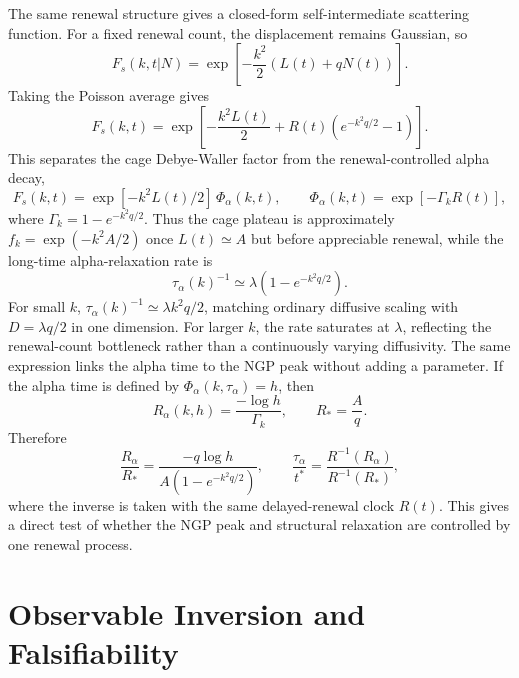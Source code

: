 \documentclass[aps,preprint,onecolumn,superscriptaddress,nofootinbib]{revtex4-2}
\begin{document}
The same renewal structure gives a closed-form self-intermediate scattering
function. For a fixed renewal count, the displacement remains Gaussian, so
\begin{equation}
  F_s(k,t|N)=
  \exp\left[-\frac{k^2}{2}\left(L(t)+qN(t)\right)\right].
\end{equation}
Taking the Poisson average gives
\begin{equation}
  F_s(k,t)=
  \exp\left[
    -\frac{k^2L(t)}{2}
    +R(t)\left(e^{-k^2q/2}-1\right)
  \right].
\end{equation}
This separates the cage Debye-Waller factor from the renewal-controlled alpha
decay,
\begin{equation}
  F_s(k,t)=
  \exp[-k^2L(t)/2]\,
  \Phi_\alpha(k,t),
  \qquad
  \Phi_\alpha(k,t)=
  \exp\left[-\Gamma_k R(t)\right],
\end{equation}
where $\Gamma_k=1-e^{-k^2q/2}$. Thus the cage plateau is approximately
$f_k=\exp(-k^2A/2)$ once $L(t)\simeq A$ but before appreciable renewal, while
the long-time alpha-relaxation rate is
\begin{equation}
  \tau_\alpha(k)^{-1}\simeq
  \lambda\left(1-e^{-k^2q/2}\right).
\end{equation}
For small $k$, $\tau_\alpha(k)^{-1}\simeq \lambda k^2q/2$, matching ordinary
diffusive scaling with $D=\lambda q/2$ in one dimension. For larger $k$, the
rate saturates at $\lambda$, reflecting the renewal-count bottleneck rather
than a continuously varying diffusivity.
The same expression links the alpha time to the NGP peak without adding a
parameter. If the alpha time is defined by
$\Phi_\alpha(k,\tau_\alpha)=h$, then
\begin{equation}
  R_\alpha(k,h)
  =\frac{-\log h}{\Gamma_k},
  \qquad
  R_\ast=\frac{A}{q}.
\end{equation}
Therefore
\begin{equation}
  \frac{R_\alpha}{R_\ast}
  =
  \frac{-q\log h}
       {A\left(1-e^{-k^2q/2}\right)},
  \qquad
  \frac{\tau_\alpha}{t^\ast}
  =
  \frac{R^{-1}(R_\alpha)}{R^{-1}(R_\ast)} ,
\end{equation}
where the inverse is taken with the same delayed-renewal clock $R(t)$. This
gives a direct test of whether the NGP peak and structural relaxation are
controlled by one renewal process.

\section{Observable Inversion and Falsifiability}
\end{document}
